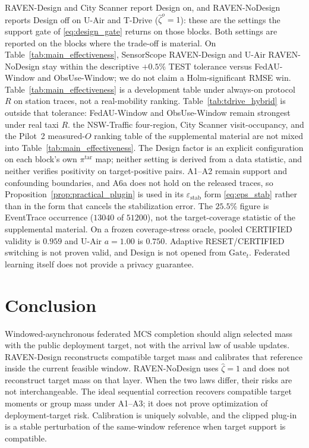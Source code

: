 \documentclass[letterpaper,journal]{IEEEtran}
\begin{document}
RAVEN-Design and City Scanner
report Design on, and RAVEN-NoDesign reports Design off on U-Air and T-Drive
($\widehat\zeta^{o}=1$): these are the settings the support gate of
\eqref{eq:design_gate} returns on those blocks.  Both settings are reported on
the blocks where the trade-off is material.
On Table~\ref{tab:main_effectiveness}, SensorScope RAVEN-Design and U-Air
RAVEN-NoDesign stay within the descriptive $+0.5\%$ TEST tolerance versus
FedAU-Window and ObsUse-Window; we do not claim a Holm-significant RMSE win.
Table~\ref{tab:main_effectiveness} is a development table under
always-on protocol $R$ on station traces, not a real-mobility ranking.
Table~\ref{tab:tdrive_hybrid} is outside that tolerance:
FedAU-Window and ObsUse-Window remain strongest under real taxi $R$.
the NSW-Traffic four-region, City Scanner visit-occupancy, and
the Pilot~2 measured-$O$ ranking table of the supplemental material are not mixed into
Table~\ref{tab:main_effectiveness}.
The Design factor is an explicit configuration on each block's own
$\pi^{\mathrm{tar}}$ map; neither setting is derived from a data statistic,
and neither verifies positivity on target-positive pairs.
A1--A2 remain support and confounding boundaries, and A6a does not hold
on the released traces, so Proposition~\ref{prop:practical_plugin} is used
in its $\varepsilon_{\mathrm{stab}}$ form \eqref{eq:eps_stab} rather than in
the form that cancels the stabilization error.
The $25.5\%$ figure is EventTrace occurrence ($13040$ of $51200$), not
the target-coverage statistic of the supplemental material.
On a frozen coverage-stress oracle, pooled CERTIFIED validity is $0.959$
and U-Air $a=1.00$ is $0.750$.  Adaptive RESET/CERTIFIED switching is not
proven valid, and Design is not opened from $\mathrm{Gate}_t$.
Federated learning itself does not provide a privacy guarantee.


\section{Conclusion}
\label{sec:conclusion}

Windowed-asynchronous federated MCS completion should align selected mass
with the public deployment target, not with the arrival law of usable
updates.  RAVEN-Design reconstructs compatible target mass and
calibrates that reference inside the current feasible window.
RAVEN-NoDesign uses $\widehat\zeta=1$ and does not reconstruct target mass on that
layer.  When the two laws differ, their risks are not
interchangeable.  The ideal sequential correction recovers compatible
target moments or group mass under A1--A3; it does not prove optimization
of deployment-target risk.  Calibration is uniquely solvable, and the
clipped plug-in is a stable perturbation of the same-window reference
when target support is compatible.
\end{document}
